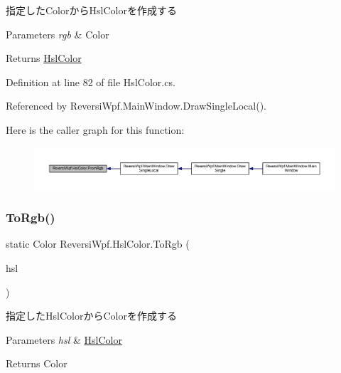 指定した\+Colorから\+Hsl\+Colorを作成する 


\begin{DoxyParams}{Parameters}
{\em rgb} & Color\\
\hline
\end{DoxyParams}
\begin{DoxyReturn}{Returns}
\hyperlink{class_reversi_wpf_1_1_hsl_color}{Hsl\+Color}
\end{DoxyReturn}


Definition at line 82 of file Hsl\+Color.\+cs.



Referenced by Reversi\+Wpf.\+Main\+Window.\+Draw\+Single\+Local().

Here is the caller graph for this function\+:
\nopagebreak
\begin{figure}[H]
\begin{center}
\leavevmode
\includegraphics[width=350pt]{class_reversi_wpf_1_1_hsl_color_a0725f254d6e13cd9e7114fe8b1645954_icgraph}
\end{center}
\end{figure}
\mbox{\label{class_reversi_wpf_1_1_hsl_color_aba11bae61cc67fcece49cbc4b18db8b1}} 
\subsubsection{\texorpdfstring{To\+Rgb()}{ToRgb()}}
{\footnotesize\ttfamily static Color Reversi\+Wpf.\+Hsl\+Color.\+To\+Rgb (\begin{DoxyParamCaption}\item[{\hyperlink{class_reversi_wpf_1_1_hsl_color}{Hsl\+Color}}]{hsl }\end{DoxyParamCaption})\hspace{0.3cm}{\ttfamily [static]}}



指定した\+Hsl\+Colorから\+Colorを作成する 


\begin{DoxyParams}{Parameters}
{\em hsl} & \hyperlink{class_reversi_wpf_1_1_hsl_color}{Hsl\+Color}\\
\hline
\end{DoxyParams}
\begin{DoxyReturn}{Returns}
Color
\end{DoxyReturn}


